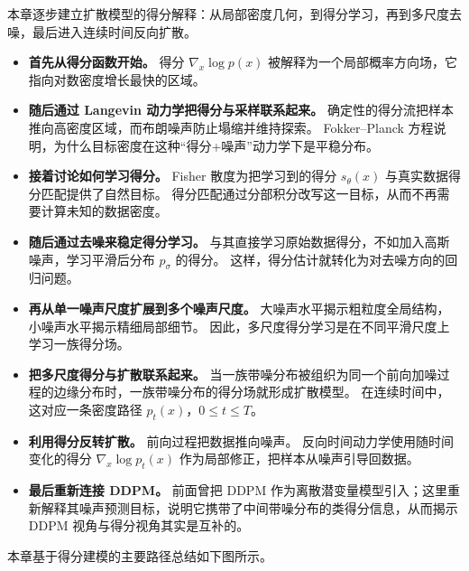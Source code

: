 本章逐步建立扩散模型的得分解释：从局部密度几何，到得分学习，再到多尺度去噪，最后进入连续时间反向扩散。

\begin{itemize}

    \item[\(\rightarrow\)] \textbf{首先从得分函数开始。}
    得分 $\nabla_x \log p(x)$ 被解释为一个局部概率方向场，它指向对数密度增长最快的区域。

    \item[\(\rightarrow\)] \textbf{随后通过 Langevin 动力学把得分与采样联系起来。}
    确定性的得分流把样本推向高密度区域，而布朗噪声防止塌缩并维持探索。
    Fokker--Planck 方程说明，为什么目标密度在这种“得分+噪声”动力学下是平稳分布。

    \item[\(\rightarrow\)] \textbf{接着讨论如何学习得分。}
    Fisher 散度为把学习到的得分 $s_\theta(x)$ 与真实数据得分匹配提供了自然目标。
    得分匹配通过分部积分改写这一目标，从而不再需要计算未知的数据密度。

    \item[\(\rightarrow\)] \textbf{随后通过去噪来稳定得分学习。}
    与其直接学习原始数据得分，不如加入高斯噪声，学习平滑后分布 $p_\sigma$ 的得分。
    这样，得分估计就转化为对去噪方向的回归问题。

    \item[\(\rightarrow\)] \textbf{再从单一噪声尺度扩展到多个噪声尺度。}
    大噪声水平揭示粗粒度全局结构，小噪声水平揭示精细局部细节。
    因此，多尺度得分学习是在不同平滑尺度上学习一族得分场。

    \item[\(\rightarrow\)] \textbf{把多尺度得分与扩散联系起来。}
    当一族带噪分布被组织为同一个前向加噪过程的边缘分布时，一族带噪分布的得分场就形成扩散模型。
    在连续时间中，这对应一条密度路径 $p_t(x)$，$0\leq t\leq T$。

    \item[\(\rightarrow\)] \textbf{利用得分反转扩散。}
    前向过程把数据推向噪声。
    反向时间动力学使用随时间变化的得分
    $\nabla_x \log p_t(x)$
    作为局部修正，把样本从噪声引导回数据。

    \item[\(\rightarrow\)] \textbf{最后重新连接 DDPM。}
    前面曾把 DDPM 作为离散潜变量模型引入；这里重新解释其噪声预测目标，说明它携带了中间带噪分布的类得分信息，从而揭示 DDPM 视角与得分视角其实是互补的。

\end{itemize}

\medskip
\noindent 本章基于得分建模的主要路径总结如下图所示。

\medskip

